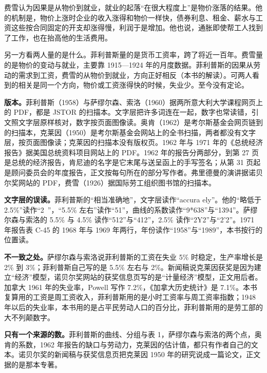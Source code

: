 费雪认为因果是从物价到就业，就业的起落“在很大程度上”是物价涨落的结果\cite{fisher1926}。他的机制是，物价上涨时企业的收入涨得和物价一样快，债券利息、租金、薪水与工资这些按合同固定的开支却涨得慢，利润于是增加\cite{fisher1926}。他也说，通胀即使帮工人找到了工作，也在抬高他的生活费用\cite{fisher1926}。

另一方看两人量的是什么。菲利普斯量的是货币工资率，跨了将近一百年\cite{phillips1958}。费雪量的是物价的变动与就业，主要靠 1915—1924 年的月度数据\cite{fisher1926}。菲利普斯的因果从劳动的需求到工资，费雪的从物价到就业，方向正好相反（本书的解读）。可两人看到的相关是同一个方向，物价或工资涨得快的时候，失业少\cite{phillips1958,fisher1926}。至今没有定论。

\begin{deeper}[史料说明]
\textbf{版本。}菲利普斯（1958）与萨缪尔森、索洛（1960）据两所意大利大学课程网页上的 PDF，都是 JSTOR 的扫描本。文字层把许多词连在一起，数字也常读错，引文照文字层原样核对，数字按页面图像读。奥肯（1962）是考尔斯基金会网页链到的扫描本，克莱因（1950）是考尔斯基金会网站上的全书扫描，两者都没有文字层，按页面图像读；克莱因的扫描本没有版权页。1962 年与 1971 年的《总统经济报告》据美国总统资料项目网站上的 PDF。1962 年的报告分两部分，到第 27 页是总统的经济报告，肯尼迪的名字是它末尾与送呈函上的手写签名；从第 31 页起是顾问委员会的年度报告，正文按每句所在的部分写作者。弗里德曼的演讲据诺贝尔奖网站的 PDF，费雪（1926）据国际劳工组织图书馆的扫描本。

\textbf{文字层的误读。}菲利普斯的“相当准确地”，文字层读作“accura ely”。他的“略低于 2.5\%”读作“2~”，“5.5\% 左右”读作“51”，曲线的系数读作“9*638”与“1394”。萨缪尔森与索洛的 5.5\% 与 4.5\% 读作“512”与“412”，2.5\% 读作“2Y2”与“2'2”。1971 年报告表 C-45 的 1968 年与 1969 年两行，年份读作“1958”与“1989”，本书按行的位置读。

\textbf{不一致之处。}萨缪尔森与索洛说菲利普斯的工资在失业 5\% 时稳定，生产率增长是 2\% 到 3\%；菲利普斯自己写的是 5.5\% 左右与 2\%。新闻稿说克莱因获奖是因为建立“经济”模型，诺贝尔奖网站的获奖信息页写的是“计量经济”模型，正文用后者。加拿大 1961 年的失业率，Powell 写作 7.2\%，《加拿大历史统计》是 7.1\%。本书复算用的工资是周工资收入，菲利普斯用的是小时工资率与周工资率指数；1948 年以后的失业率，本书用的是占平民劳动人口的百分比，菲利普斯用的是劳工部的大不列颠数字。

\textbf{只有一个来源的数。}菲利普斯的曲线、分组与表 1，萨缪尔森与索洛的两个点，奥肯的系数，1962 年报告的缺口与劳动力，克莱因的估计值，都只有作者自己的文本。诺贝尔奖的新闻稿与获奖信息页把克莱因 1950 年的研究说成一篇论文，正文据的是那本专著。


\end{deeper}
